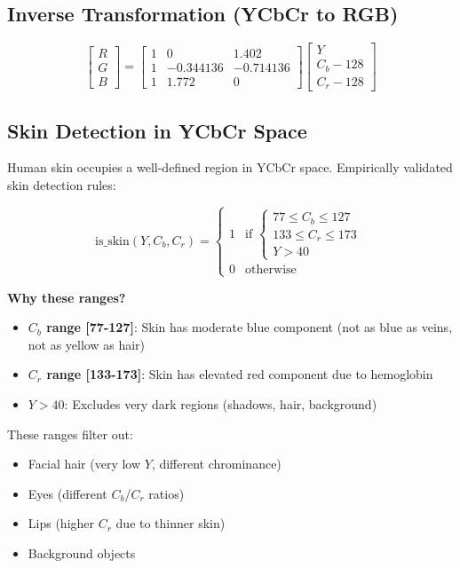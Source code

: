 \documentclass[11pt,a4paper]{article}
\begin{document}
\subsection{Inverse Transformation (YCbCr to RGB)}

\begin{equation}
\begin{bmatrix} R \\ G \\ B \end{bmatrix} = 
\begin{bmatrix}
1 & 0 & 1.402 \\
1 & -0.344136 & -0.714136 \\
1 & 1.772 & 0
\end{bmatrix}
\begin{bmatrix} Y \\ C_b - 128 \\ C_r - 128 \end{bmatrix}
\end{equation}

\subsection{Skin Detection in YCbCr Space}

Human skin occupies a well-defined region in YCbCr space. Empirically validated skin detection rules:

\begin{equation}
\text{is\_skin}(Y, C_b, C_r) = \begin{cases}
1 & \text{if } \begin{cases}
77 \leq C_b \leq 127 \\
133 \leq C_r \leq 173 \\
Y > 40
\end{cases} \\
0 & \text{otherwise}
\end{cases}
\end{equation}

\begin{tcolorbox}[colback=orange!5!white,colframe=orange!75!black,title=Physical Interpretation]
\textbf{Why these ranges?}
\begin{itemize}
    \item \textbf{$C_b$ range [77-127]}: Skin has moderate blue component (not as blue as veins, not as yellow as hair)
    \item \textbf{$C_r$ range [133-173]}: Skin has elevated red component due to hemoglobin
    \item \textbf{$Y > 40$}: Excludes very dark regions (shadows, hair, background)
\end{itemize}

These ranges filter out:
\begin{itemize}
    \item Facial hair (very low $Y$, different chrominance)
    \item Eyes (different $C_b$/$C_r$ ratios)
    \item Lips (higher $C_r$ due to thinner skin)
    \item Background objects
\end{itemize}
\end{tcolorbox}
\end{document}
